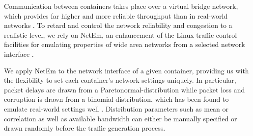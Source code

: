 \documentclass[runningheads]{llncs}
\begin{document}


Communication between containers takes place over a virtual bridge network, which provides far higher and more reliable throughput than in real-world networks \cite{iperf}. To retard and control the network reliability and congestion to a realistic level, we rely on NetEm, an enhancement of the Linux traffic control facilities for emulating properties of wide area networks from a selected network interface \cite{hemminger2005network}.


We apply NetEm to the network interface of a given container, providing us with the flexibility to set each container's network settings uniquely. In particular, packet delays are drawn from a Paretonormal-distribution while packet loss and corruption is drawn from a binomial distribution, which has been found to emulate real-world settings well \cite{jurgelionis2011empirical}. Distribution parameters such as mean or correlation as well as available bandwidth can either be manually specified or drawn randomly before the traffic generation process.


\end{document}
